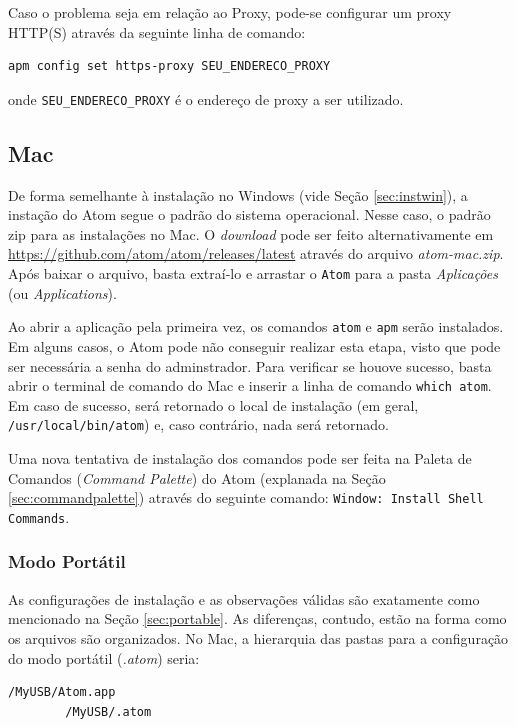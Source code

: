 	Caso o problema seja em relação ao Proxy, pode-se configurar um proxy HTTP(S) através da seguinte linha de comando:
	\begin{Verbatim}[fontsize=\footnotesize]
		apm config set https-proxy SEU_ENDERECO_PROXY
	\end{Verbatim}
	onde \verb|SEU_ENDERECO_PROXY| é o endereço de proxy a ser utilizado.

	\subsection{Mac}
	De forma semelhante à instalação no Windows (vide Seção \ref{sec:instwin}), a instação do Atom segue o padrão do sistema operacional. Nesse caso, o padrão zip para as instalações no Mac. O \textit{download} pode ser feito alternativamente em \href{https://github.com/atom/atom/releases/latest}{https://github.com/atom/atom/releases/latest} através do arquivo \textit{atom-mac.zip}. Após baixar o arquivo, basta extraí-lo e arrastar o \verb|Atom| para a pasta \textit{Aplicações} (ou \textit{Applications}).

	Ao abrir a aplicação pela primeira vez, os comandos \verb|atom| e \verb|apm| serão instalados. Em alguns casos, o Atom pode não conseguir realizar esta etapa, visto que pode ser necessária a senha do adminstrador. Para verificar se houove sucesso, basta abrir o terminal de comando do Mac e inserir a linha de comando \verb|which atom|. Em caso de sucesso, será retornado o local de instalação (em geral, \verb|/usr/local/bin/atom|) e, caso contrário, nada será retornado.

	Uma nova tentativa de instalação dos comandos pode ser feita na Paleta de Comandos (\textit{Command Palette}) do Atom (explanada na Seção \ref{sec:commandpalette}) através do seguinte comando: \verb|Window: Install Shell Commands|.

	\subsubsection{Modo Portátil}
	As configurações de instalação e as observações válidas são exatamente como mencionado na Seção \ref{sec:portable}. As diferenças, contudo, estão na forma como os arquivos são organizados. No Mac, a hierarquia das pastas para a configuração do modo portátil (\textit{.atom}) seria:
	\begin{Verbatim}[fontsize=\footnotesize]
		/MyUSB/Atom.app
		/MyUSB/.atom
	\end{Verbatim}


